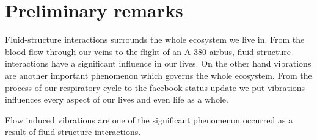 \chapter{Preliminary remarks}

Fluid-structure interactions surrounds the whole ecosystem we live in. From the blood flow through our veins to the flight of an A-380 airbus, fluid structure interactions have a significant influence in our lives. On the other hand vibrations are another important phenomenon which governs the whole ecosystem. From the process of our respiratory cycle to the facebook status update we put vibrations influences every aspect of our lives and even life as a whole.  


Flow induced vibrations are one of the significant phenomenon occurred as a result of fluid structure interactions.   